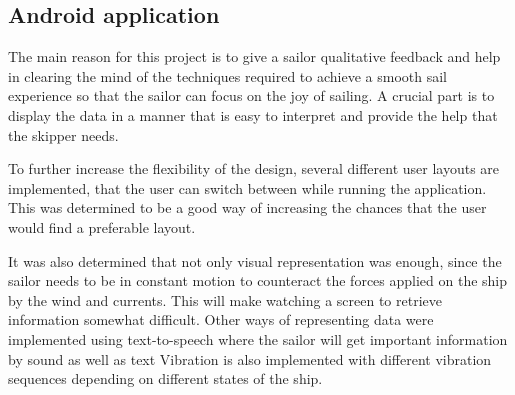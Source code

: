 \subsection{Android application}
The main reason for this project is to give a sailor qualitative feedback and help in clearing the mind of the techniques required to achieve a smooth sail experience so that the sailor can focus on the joy of sailing.
A crucial part is to display the data in a manner that is easy to interpret and provide the help that the skipper needs.

To further increase the flexibility of the design, several different user layouts are implemented, that the user can switch between while running the application. This was determined to be a good way of increasing the chances that the user would find a preferable layout.

It was also determined that not only visual representation was enough, since the sailor needs to be in constant motion to counteract the forces applied on the ship by the wind and currents. This will make watching a screen to retrieve information somewhat difficult.
Other ways of representing data were implemented using text-to-speech where the sailor will get important information by sound as well as text
 Vibration is also implemented with different vibration sequences depending on different states of the ship.


